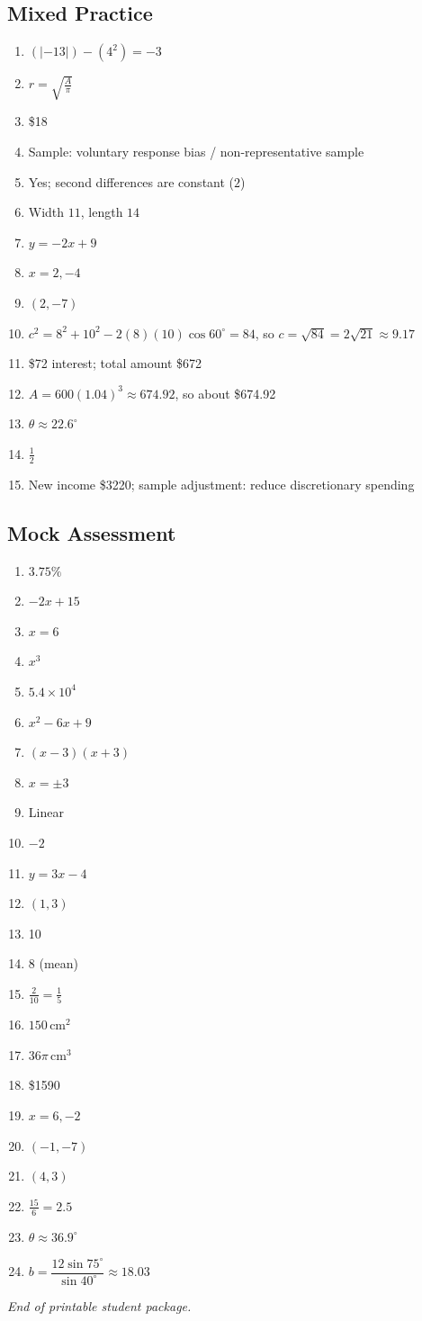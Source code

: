 \documentclass[12pt,oneside]{article}
\begin{document}
\subsection*{Mixed Practice}
\begin{enumerate}
  \item $(|-13|)-(4^2)=-3$
  \item $r=\sqrt{\frac{A}{\pi}}$
  \item \$18
  \item Sample: voluntary response bias / non-representative sample
  \item Yes; second differences are constant ($2$)
  \item Width $11$, length $14$
  \item $y=-2x+9$
  \item $x=2,-4$
  \item $(2,-7)$
  \item $c^2=8^2+10^2-2(8)(10)\cos60^\circ=84$, so $c=\sqrt{84}=2\sqrt{21}\approx9.17$
  \item \$72 interest; total amount \$672
  \item $A=600(1.04)^3\approx 674.92$, so about \$674.92
  \item $\theta\approx22.6^\circ$
  \item $\frac12$
  \item New income \$3220; sample adjustment: reduce discretionary spending
\end{enumerate}

\subsection*{Mock Assessment}
\begin{enumerate}
  \item $3.75\%$
  \item $-2x+15$
  \item $x=6$
  \item $x^3$
  \item $5.4\times10^4$
  \item $x^2-6x+9$
  \item $(x-3)(x+3)$
  \item $x=\pm3$
  \item Linear
  \item $-2$
  \item $y=3x-4$
  \item $(1,3)$
  \item 10
  \item 8 (mean)
  \item $\frac{2}{10}=\frac15$
  \item $150\,\text{cm}^2$
  \item $36\pi\,\text{cm}^3$
  \item \$1590
  \item $x=6,-2$
  \item $(-1,-7)$
  \item $(4,3)$
  \item $\frac{15}{6}=2.5$
  \item $\theta\approx36.9^\circ$
  \item $b=\dfrac{12\sin75^\circ}{\sin40^\circ}\approx18.03$
\end{enumerate}

\vfill
\begin{center}
\textit{End of printable student package.}
\end{center}
\end{document}
